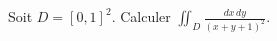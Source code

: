 \begin{exercice}[\minsyndical]\label{exoIntegralesMultiples0001}

Soit $D=[0,1]^2$. Calculer $\displaystyle \iint_D \frac{dx\,dy}{(x+y+1)^2}$.


\end{exercice}
